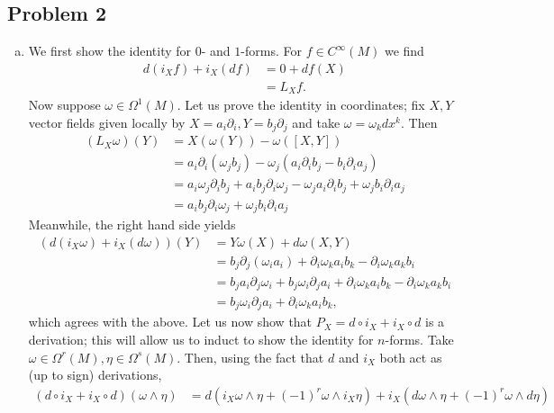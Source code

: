 \documentclass{../mathnotes}
\begin{document}
\subsection*{Problem 2}
\begin{enumerate}[(a)]
    \item We first show the identity for $0$- and $1$-forms. For $f\in C^\infty(M)$ we find
        \begin{align*}
            d(i_Xf)+i_X(df) &= 0+df(X)\\
            &= L_Xf.
        \end{align*}
        Now suppose $\omega\in\Omega^1(M)$.
        Let us prove the identity in coordinates; fix $X,Y$
        vector fields given locally by $X=a_i\partial_i,Y=b_j\partial_j$ and take $\omega=\omega_kdx^k$.
        Then
        \begin{align*}
            (L_X\omega)(Y) &= X(\omega(Y))-\omega([X,Y])\\
            &= a_i\partial_i(\omega_jb_j)-\omega_j(a_i\partial_ib_j-b_i\partial_ia_j)\\
            &= a_i\omega_j\partial_ib_j+a_ib_j\partial_i\omega_j-\omega_ja_i\partial_ib_j+\omega_jb_i\partial_ia_j\\
            &= a_ib_j\partial_i\omega_j+\omega_jb_i\partial_ia_j
        \end{align*}
        Meanwhile, the right hand side yields
        \begin{align*}
            (d(i_X\omega)+i_X(d\omega))(Y)&=Y\omega(X)+d\omega(X,Y)\\
            &=b_j\partial_j(\omega_ia_i) + \partial_i\omega_ka_ib_k-\partial_i\omega_ka_kb_i\\
            &=b_ja_i\partial_j\omega_i+b_j\omega_i\partial_ja_i+\partial_i\omega_ka_ib_k-\partial_i\omega_ka_kb_i\\
            &=b_j\omega_i\partial_ja_i+\partial_i\omega_ka_ib_k,
        \end{align*}
        which agrees with the above.
        Let us now show that $P_X=d\circ i_X+i_X\circ d$ is a derivation; this will allow
        us to induct to show the identity for $n$-forms. Take $\omega\in\Omega^r(M),\eta\in\Omega^s(M)$.
        Then, using the fact that $d$ and $i_X$ both act as (up to sign) derivations,
        \begin{align*}
            (d\circ i_X+i_X\circ d)(\omega\wedge\eta) &=d(i_X\omega\wedge\eta+(-1)^r\omega\wedge i_X\eta)+i_X(d\omega\wedge\eta+(-1)^r\omega\wedge d\eta)\\

\end{align*}
\end{enumerate}
\end{document}
